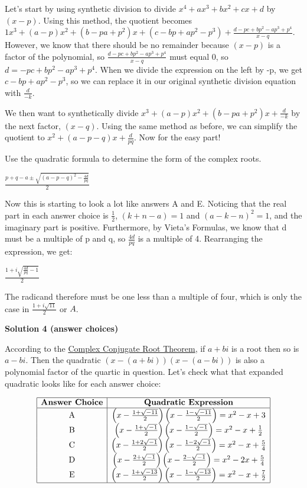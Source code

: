 \begin{enumerate}
 Let's start by using synthetic division to divide $x^4+ax^3+bx^2+cx+d$ by $(x-p)$. Using this method, the quotient becomes $1x^3+(a-p)x^2+(b-pa+p^2)x+(c-bp+ap^2-p^3)+\frac{d-pc+bp^2-ap^3+p^4}{x-q}$. However, we know that there should be no remainder because $(x-p)$ is a factor of the polynomial, so $\frac{d-pc+bp^2-ap^3+p^4}{x-q}$ must equal 0, so $d=-pc+bp^2-ap^3+p^4$. When we divide the expression on the left by -p, we get $c-bp+ap^2-p^3$, so we can replace it in our original synthetic division equation with $\frac {d}{-k}$.

 We then want to synthetically divide $x^3+(a-p)x^2+(b-pa+p^2)x+\frac {d}{-k}$ by the next factor, $(x-q)$. Using the same method as before, we can simplify the quotient to $x^2+(a-p-q)x+\frac{d}{pq}$. Now for the easy part!

 Use the quadratic formula to determine the form of the complex roots.

 $\frac{p+q-a\pm\sqrt{(a-p-q)^2-\frac{4d}{pq}}}{2}$

 Now this is starting to look a lot like answers A and E. Noticing that the real part in each answer choice is $\frac{1}{2}$, $(k+n-a)=1$ and $(a-k-n)^2=1$, and the imaginary part is positive. Furthermore, by Vieta's Formulas, we know that d must be a multiple of p and q, so $\frac{4d}{pq}$ is a multiple of 4. Rearranging the expression, we get:

 $\frac{1+i\sqrt{\frac{4d}{pq}-1}}{2}$

 The radicand therefore must be one less than a multiple of four, which is only the case in $\frac {1 + i \sqrt {11}}{2}$ or $\boxed{A}$.

 



\textbf{Solution 4 (answer choices)}

According to the \href{https://artofproblemsolving.com/wiki/index.php/Complex\_Conjugate\_Root\_Theorem}{Complex Conjugate Root Theorem}, if $a+bi$ is a root then so is $a-bi$.  Then the quadratic $(x-(a+bi))(x-(a-bi))$ is also a polynomial factor of the quartic in question.  Let's check what that expanded quadratic looks like for each answer choice:

 
 \[ \begin{array}{|c|c|} \hline \textbf{Answer Choice} & \textbf{Quadratic Expression} \\ \hline \text{A} & \left(x - \frac{1 + \sqrt{-11}}{2}\right)\left(x - \frac{1 - \sqrt{-11}}{2}\right) = x^2 - x + 3 \\ \text{B} & \left(x - \frac{1 + \sqrt{-1}}{2}\right)\left(x - \frac{1 - \sqrt{-1}}{2}\right) = x^2 - x + \frac{1}{2} \\ \text{C} & \left(x - \frac{1 + 2\sqrt{-1}}{2}\right)\left(x - \frac{1 - 2\sqrt{-1}}{2}\right) = x^2 - x + \frac{5}{4} \\ \text{D} & \left(x - \frac{2 + \sqrt{-1}}{2}\right)\left(x - \frac{2 - \sqrt{-1}}{2}\right) = x^2 - 2x + \frac{5}{4} \\ \text{E} & \left(x - \frac{1 + \sqrt{-13}}{2}\right)\left(x - \frac{1 - \sqrt{-13}}{2}\right) = x^2 - x + \frac{7}{2} \\ \hline \end{array} \]


\end{enumerate}
